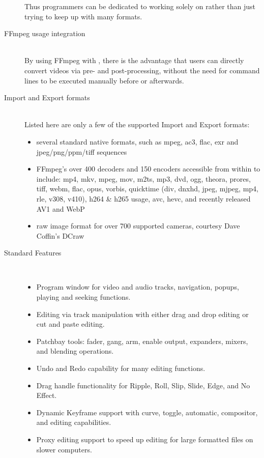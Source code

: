 \begin{description}
        Thus \CGG{} programmers can be dedicated to working solely on \CGG{} rather than just trying to keep up with many formats.
    \item[FFmpeg usage integration]~\\
        By using FFmpeg with \CGG{}, there is the advantage that users can directly convert videos via pre- and post-processing, without the need for command lines to be executed manually before or afterwards.
    \item[Import and Export formats]~\\
        Listed here are only a few of the supported Import and Export formats:
        \begin{itemize}
            \item  several standard native formats, such as mpeg, ac3, flac, exr and jpeg/png/ppm/tiff sequences
            \item FFmpeg’s over 400 decoders and 150 encoders accessible from within \CGG{} to include:
                mp4, mkv, mpeg, mov, m2ts, mp3, dvd, ogg, theora, prores, tiff, webm, flac, opus, vorbis,
                quicktime (div, dnxhd, jpeg, mjpeg, mp4, rle, v308, v410), h264 \& h265 usage, avc, hevc,
                and recently released AV1 and WebP
            \item raw image format for over 700 supported cameras, courtesy Dave Coffin's DCraw
        \end{itemize}
        \item[Standard Features]~\\
            \begin{itemize}
                \item Program window for video and audio tracks, navigation, popups, playing and seeking functions.
                \item Editing via track manipulation with either drag and drop editing or cut and paste editing.
                \item  Patchbay tools: fader, gang, arm, enable output, expanders, mixers, and blending operations.
                \item Undo and Redo capability for many editing functions.
                \item Drag handle functionality for Ripple, Roll, Slip, Slide, Edge, and No Effect.
                \item Dynamic Keyframe support with curve, toggle, automatic, compositor, and editing capabilities.
                \item Proxy editing support to speed up editing for large formatted files on slower computers.

\end{itemize}
\end{description}
